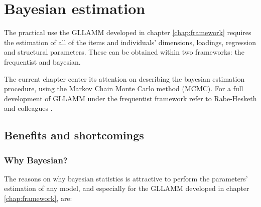 \chapter{Bayesian estimation } \label{chap:estimation}

The practical use the GLLAMM developed in chapter \ref{chap:framework} requires the estimation of all of the items and individuals' dimensions, loadings, regression and structural parameters. These can be obtained within two frameworks: the frequentist and bayesian. 

The current chapter center its attention on describing the bayesian estimation procedure, using the Markov Chain Monte Carlo method (MCMC). For a full development of GLLAMM under the frequentist framework refer to Rabe-Hesketh and colleagues \cite{Rabe_et_al_2004a, Rabe_et_al_2004b, Skrondal_et_al_2004a, Rabe_et_al_2012}.


\section{Benefits and shortcomings}

\subsection{Why Bayesian?} \label{sub_sect:goods}

The reasons on why bayesian statistics is attractive to perform the parameters' estimation of any model, and especially for the GLLAMM developed in chapter \ref{chap:framework}, are:

